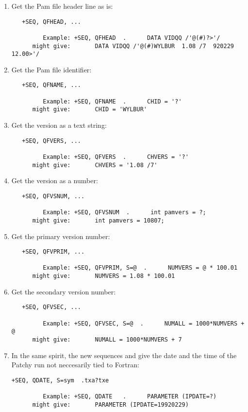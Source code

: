 \begin{enumerate}
\item
Get the Pam file header line as is:
\begin{verbatim}
   +SEQ, QFHEAD, ...

         Example: +SEQ, QFHEAD  .      DATA VIDQQ /'@(#)?>'/
      might give:       DATA VIDQQ /'@(#)WYLBUR  1.08 /7  920229 12.00>'/
\end{verbatim}
\item
Get the Pam file identifier:
\begin{verbatim}
   +SEQ, QFNAME, ...

         Example: +SEQ, QFNAME  .      CHID = '?'
      might give:       CHID = 'WYLBUR'
\end{verbatim}
\item
Get the version as a text string:
\begin{verbatim}
   +SEQ, QFVERS, ...

         Example: +SEQ, QFVERS  .      CHVERS = '?'
      might give:       CHVERS = '1.08 /7'
\end{verbatim}
\item
Get the version as a number:
\begin{verbatim}
   +SEQ, QFVSNUM, ...

         Example: +SEQ, QFVSNUM  .      int pamvers = ?;
      might give:       int pamvers = 10807;
\end{verbatim}
\item
Get the primary version number:
\begin{verbatim}
   +SEQ, QFVPRIM, ...

         Example: +SEQ, QFVPRIM, S=@  .      NUMVERS = @ * 100.01
      might give:       NUMVERS = 1.08 * 100.01
\end{verbatim}
\item
Get the secondary version number:
\begin{verbatim}
   +SEQ, QFVSEC, ...

         Example: +SEQ, QFVSEC, S=@  .      NUMALL = 1000*NUMVERS + @
      might give:       NUMALL = 1000*NUMVERS + 7
\end{verbatim}
\item
In the same spirit, the new sequences  and  give
the date and the time of the Patchy run not neccesarily tied to Fortran:
\begin{verbatim}
+SEQ, QDATE, S=sym  .txa?txe

         Example: +SEQ, QDATE   .      PARAMETER (IPDATE=?)
      might give:       PARAMETER (IPDATE=19920229)


\end{verbatim}
\end{enumerate}

